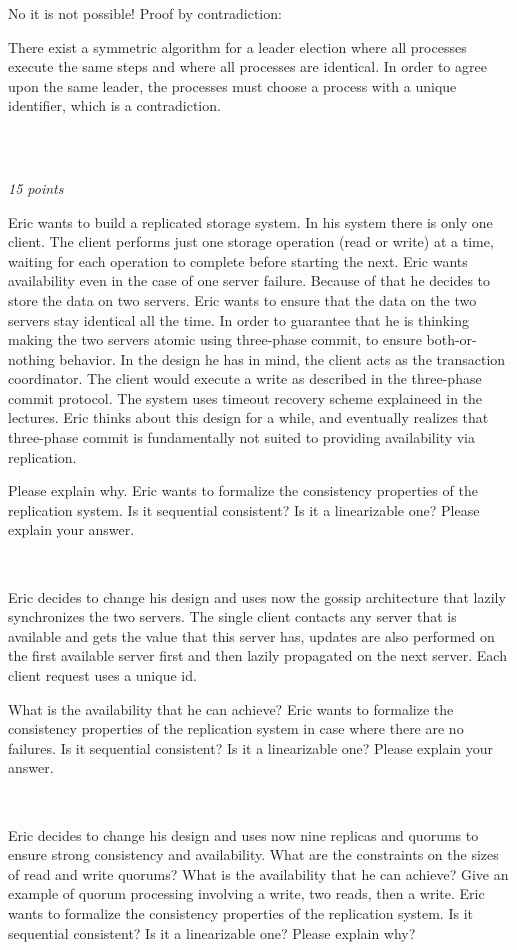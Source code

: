 \documentclass[a4paper]{article}
\newcommand{\points}[1]{\subsection{} \textit{#1 points}\\}
\newcommand{\question}[2][]{
  \parbox[t]{\textwidth}{
    \ifthenelse{\equal{#1}{}}{}{#1)}
    \parbox[t]{0.95\textwidth}{#2}}\\}
\newcommand{\solution}[2][]{
  \ifthenelse{\equal{#1}{} \or \equal{#1}{a}}{\\[3pt]\textit{Solution: }\\[0.1cm]}{}
  \question[#1]{#2}
}
\begin{document}
\solution[c]{
  No it is not possible! Proof by contradiction:

  There exist a symmetric algorithm for a leader election where all
  processes execute the same steps and where all processes are
  identical. In order to agree upon the same leader, the processes must
  choose a process with a unique identifier, which is a contradiction.
}
\points{15}
\question[a]{
  Eric wants to build a replicated storage system. In his
  system there is only one client. The client performs just one
  storage operation (read or write) at a time, waiting for each
  operation to complete before starting the next. Eric wants
  availability even in the case of one server failure. Because of that
  he decides to store the data on two servers. Eric wants to ensure
  that the data on the two servers stay identical all the time. In
  order to guarantee that he is thinking making the two servers atomic
  using three-phase commit, to ensure both-or-nothing behavior. In the
  design he has in mind, the client acts as the transaction
  coordinator. The client would execute a write as described in the
  three-phase commit protocol. The system uses timeout recovery scheme
  explaineed in the lectures. Eric thinks about this design for a
  while, and eventually realizes that three-phase commit is
  fundamentally not suited to providing availability via
  replication.

  Please explain why. Eric wants to formalize the consistency
  properties of the replication system. Is it sequential consistent?
  Is it a linearizable one? Please explain your answer.
}
\question[b]{
  Eric decides to change his design and uses now the gossip
  architecture that lazily synchronizes the two servers. The single
  client contacts any server that is available and gets the value that
  this server has, updates are also performed on the first available
  server first and then lazily propagated on the next server. Each
  client request uses a unique id.

  What is the availability that he can achieve? Eric wants to
  formalize the consistency properties of the replication system in
  case where there are no failures. Is it sequential consistent? Is it
  a linearizable one? Please explain your answer.
}
\question[c]{
  Eric decides to change his design and uses now nine replicas
  and quorums to ensure strong consistency and availability. What are
  the constraints on the sizes of read and write quorums? What is the
  availability that he can achieve? Give an example of quorum
  processing involving a write, two reads, then a write. Eric wants
  to formalize the consistency properties of the replication
  system. Is it sequential consistent? Is it a linearizable one?
  Please explain why?
}
\end{document}
